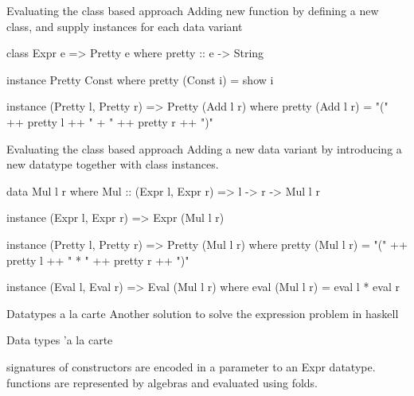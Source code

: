 \documentclass[10pt, compress]{beamer}
\newcommand{\inlinecode}[2]{\colorbox{backg}{\scriptsize{\texttt{#2}}}}
\newenvironment{slide}[1]{\begin{frame}[fragile,environment=slide]{#1}}{\end{frame}}
\newenvironment{slide}[2]{\begin{frame}[fragile,environment=slide]{#1}{#2}}{\end{frame}}
\begin{document}
\begin{slide}{Evaluating the class based approach}
Adding new function by defining a new class, and supply instances for each data variant
\begin{haskell}
class Expr e => Pretty e where
 pretty :: e -> String

instance Pretty Const where
 pretty (Const i) = show i

instance (Pretty l, Pretty r) => Pretty (Add l r) where
 pretty (Add l r) = "(" ++ pretty l ++ " + " ++ pretty r ++ ")"
\end{haskell}
\end{slide}


\begin{slide}{Evaluating the class based approach}
Adding a new data variant by introducing a new datatype together with class instances.
\begin{haskell}
data Mul l r where
  Mul :: (Expr l, Expr r) => l -> r -> Mul l r

instance (Expr l, Expr r) => Expr (Mul l r)

instance (Pretty l, Pretty r) => Pretty (Mul l r) where
 pretty (Mul l r) = "(" ++ pretty l ++ " * " ++ pretty r ++ ")"   %

instance (Eval l, Eval r) => Eval (Mul l r) where
 eval (Mul l r) = eval l * eval r
\end{haskell}
\end{slide}

%
%



\begin{slide}{Datatypes a la carte}
Another solution to solve the expression problem in haskell 

Data types 'a la carte

signatures of constructors are encoded in a parameter to an Expr datatype.
functions are represented by algebras and evaluated using folds.
\end{slide}
\end{document}

